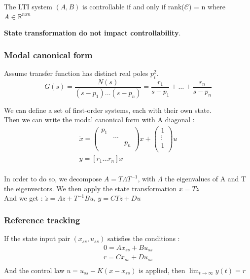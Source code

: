 \documentclass[../main.tex]{subfiles}
\begin{document}
\begin{theorem}
    The LTI system $(A,B)$ is controllable if and only if rank($\mathcal{C}$) = n where $A\in \mathbb{R}^{nxn}$\\
\end{theorem}

\textbf{State transformation do not impact controllability}.\\

\subsubsection{Modal canonical form}
Assume transfer function has distinct real poles $p_i^2$.\\
\begin{equation}
    G(s) = \frac{N(s)}{(s-p_1)\dots(s-p_n)} = \frac{r_1}{s-p_1} + \dots + \frac{r_n}{s-p_n}
\end{equation}

We can define a set of first-order systems, each with their own state.\\
Then we can write the modal canonical form with A diagonal : \begin{equation}
    \begin{gathered}
        \dot{x} = \begin{pmatrix}
            p_1 & &\\
             & \dots & \\
              & & p_n\\
        \end{pmatrix}x + \begin{pmatrix}
            1\\ \vdots \\ 1\\
        \end{pmatrix}u\\
        y = [r_1 \dots r_n]x\\
    \end{gathered}
\end{equation}

In order to do so, we decompose $A = T\Lambda T^{-1}$, with $\Lambda$ the eigenvalues of A and T the eigenvectors. We then apply the state transformation $x = Tz$\\
And we get : $\dot{z} = \Lambda z + T^{-1} Bu$, $y = CTz + Du$\\

\subsubsection{Reference tracking}
If the state input pair $(x_{ss}, u_{ss})$ satisfies the conditions : \begin{equation}
    \begin{gathered}
        0 = Ax_{ss} + Bu_{ss}\\
        r = C x_{ss} + Du_{ss}\\
    \end{gathered}
\end{equation}
And the control law $u = u_{ss} -K(x-x_{ss})$ is applied, then $\lim_{t\rightarrow \infty}y(t) = r$\\
\end{document}
